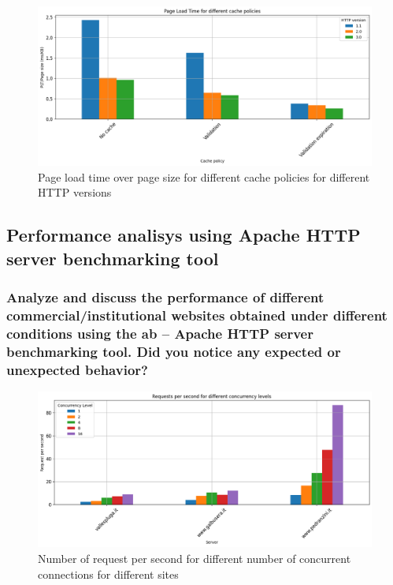 \documentclass[eng]{class}
\begin{document}
\begin{figure}[H]
  \centering
  \includegraphics[width=\columnwidth]{images/plt_cache_policy.png}
  \caption{Page load time over page size for different cache policies for different HTTP versions}
  \label{fig-2}
\end{figure}

\subsection{Performance analisys using  Apache HTTP server benchmarking tool}
\subsubsection*{Analyze and discuss the performance of different commercial/institutional websites obtained
  under different conditions using the ab – Apache HTTP server benchmarking tool. Did you
  notice any expected or unexpected behavior?}

\begin{figure}[H]
  \centering
  \includegraphics[width=\columnwidth]{images/Request_per_second_diff_conc.png}
  \caption{Number of request per second for different number of concurrent connections for different sites}
  \label{fig-3}
\end{figure}
\end{document}
